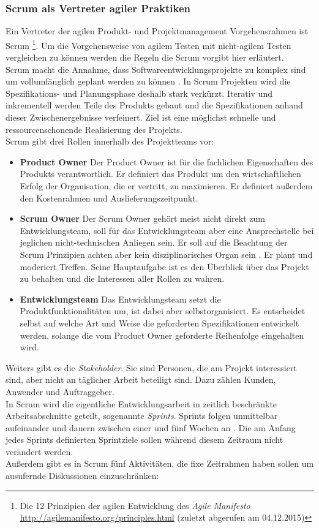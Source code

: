 \subsubsection{Scrum als Vertreter agiler Praktiken}
\label{sec:scrum}
Ein Vertreter der agilen Produkt- und Projektmanagement Vorgehensrahmen ist Scrum \footnote{Die 12 Prinzipien der agilen Entwicklung des \textit{Agile Manifesto} \url{http://agilemanifesto.org/principles.html} (zuletzt abgerufen am 04.12.2015)}. Um die Vorgehensweise von agilem Testen mit nicht-agilem Testen vergleichen zu können werden die Regeln die Scrum vorgibt hier erläutert.\\
Scrum macht die Annahme, dass Softwareentwicklungsprojekte zu komplex sind um vollumfänglich geplant werden zu können \cite{linz_testing_2014}. In Scrum Projekten wird die Spezifikations- und Planungsphase deshalb stark verkürzt. Iterativ und inkrementell werden Teile des Produkts gebaut und die Spezifikationen anhand dieser Zwischenergebnisse verfeinert. Ziel ist eine möglichst schnelle und ressourcenschonende Realisierung des Projekts.\\
Scrum gibt drei Rollen innerhalb des Projektteams vor:

\begin{itemize}
\item \textbf{Product Owner} Der Product Owner ist für die fachlichen Eigenschaften des Produkts verantwortlich. Er definiert das Produkt um den wirtschaftlichen Erfolg der Organisation, die er vertritt, zu maximieren. Er definiert außerdem den Kostenrahmen und Auslieferungszeitpunkt.
\item \textbf{Scrum Owner} Der Scrum Owner gehört meist nicht direkt zum Entwicklungsteam, soll für das Entwicklungsteam aber eine Ansprechstelle bei jeglichen nicht-technischen Anliegen sein. Er soll auf die Beachtung der Scrum Prinzipien achten aber kein disziplinarisches Organ sein \cite{linz_testing_2014}. Er plant und moderiert Treffen. Seine Hauptaufgabe ist es den Überblick über das Projekt zu behalten und die Interessen aller Rollen zu wahren.
\item \textbf{Entwicklungsteam} Das Entwicklungsteam setzt die Produktfunktionalitäten um, ist dabei aber selbstorganisiert. Es entscheidet selbst auf welche Art und Weise die geforderten Spezifikationen entwickelt werden, solange die vom Product Owner geforderte Reihenfolge eingehalten wird.
\end{itemize}

Weiters gibt es die \textit{Stakeholder}. Sie sind Personen, die am Projekt interessiert sind, aber nicht an täglicher Arbeit beteiligt sind. Dazu zählen Kunden, Anwender und Auftraggeber.\\
In Scrum wird die eigentliche Entwicklungsarbeit in zeitlich beschränkte Arbeitsabschnitte geteilt, sogenannte \textit{Sprints}. Sprints folgen unmittelbar aufeinander und dauern zwischen einer und fünf Wochen an \cite{linz_testing_2014}. Die am Anfang jedes Sprints definierten Sprintziele sollen während diesem Zeitraum nicht verändert werden.\\
Außerdem gibt es in Scrum fünf Aktivitäten, die fixe Zeitrahmen haben sollen um ausufernde Diskussionen einzuschränken:

